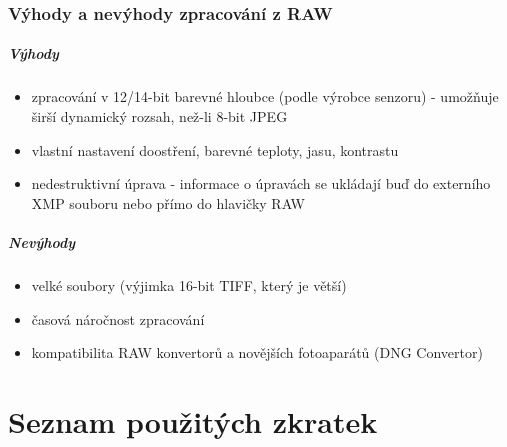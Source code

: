\documentclass[12pt,a4paper,titlepage,final]{report}
\begin{document}
\subsection{Výhody a nevýhody zpracování z RAW}

\paragraph{Výhody}
	    		\begin{itemize}
	    			\item zpracování v 12/14-bit barevné hloubce (podle výrobce senzoru) - umožňuje širší dynamický rozsah, než-li 8-bit JPEG
	    			\item vlastní nastavení doostření, barevné teploty, jasu, kontrastu
	    			\item nedestruktivní úprava - informace o úpravách se ukládají buď do externího XMP souboru nebo přímo do hlavičky RAW
	    		\end{itemize}	



\paragraph{Nevýhody}
	    		\begin{itemize}
	    			\item velké soubory (výjimka 16-bit TIFF, který je větší)
	    			\item časová náročnost zpracování
	    			\item kompatibilita RAW konvertorů a novějších fotoaparátů (DNG Convertor)
	    		\end{itemize}





\nocite{cite1}
\nocite{cite2}
\nocite{cite3}
\nocite{cite4}
\nocite{cite5}
\nocite{wiki1}
\nocite{wiki2}
\nocite{wiki3}

\hypertarget{bib}{}


\appendix

\chapter{Seznam použitých zkratek}
\end{document}
